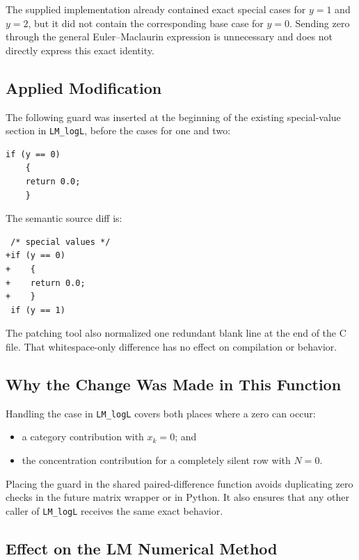 \documentclass[11pt,a4paper]{article}
\begin{document}
The supplied implementation already contained exact special cases for
\(y=1\) and \(y=2\), but it did not contain the corresponding base case for
\(y=0\). Sending zero through the general Euler--Maclaurin expression is
unnecessary and does not directly express this exact identity.

\subsection{Applied Modification}

The following guard was inserted at the beginning of the existing special-value
section in \texttt{LM\_logL}, before the cases for one and two:

\begin{verbatim}
if (y == 0)
    {
    return 0.0;
    }
\end{verbatim}

The semantic source diff is:

\begin{verbatim}
 /* special values */
+if (y == 0)
+    {
+    return 0.0;
+    }
 if (y == 1)
\end{verbatim}

The patching tool also normalized one redundant blank line at the end of the C
file. That whitespace-only difference has no effect on compilation or behavior.

\subsection{Why the Change Was Made in This Function}

Handling the case in \texttt{LM\_logL} covers both places where a zero can
occur:

\begin{itemize}

\item a category contribution with \(x_k=0\); and

\item the concentration contribution for a completely silent row with
\(N=0\).

\end{itemize}

Placing the guard in the shared paired-difference function avoids duplicating
zero checks in the future matrix wrapper or in Python. It also ensures that any
other caller of \texttt{LM\_logL} receives the same exact behavior.

\subsection{Effect on the LM Numerical Method}
\end{document}
